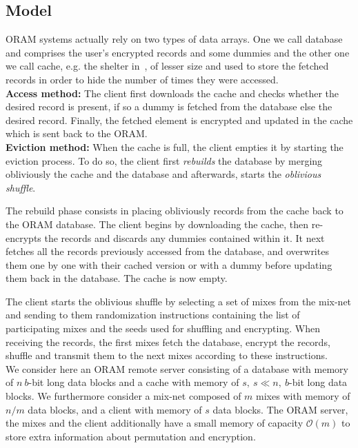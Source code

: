 \documentclass[USenglish,oneside,twocolumn]{article}
\begin{document}
\subsection{Model}\label{Model}

ORAM systems actually rely on two types of data arrays. One we call database and comprises the user's encrypted records and some dummies and the other one we call cache, e.g. the shelter in~\cite{goldreich87}, of lesser size and used to store the fetched records in order to hide the number of times they were accessed.\\

\noindent\textbf{Access method:} The client first downloads the cache and checks whether the desired record is present, if so a dummy is fetched from the database else the desired record. Finally, the fetched element is encrypted and updated in the cache which is sent back to the ORAM.\\

\noindent\textbf{Eviction method:} When the cache is full, the client empties it by starting the eviction process. To do so, the client first \textit{rebuilds} the database by merging obliviously the cache and the database and afterwards, starts the \textit{oblivious shuffle}.

\noindent The rebuild phase consists in placing obliviously records from the cache back to the ORAM database. The client begins by downloading the cache, then re-encrypts the records and discards any dummies contained within it. It next fetches all the records previously accessed from the database, and overwrites them one by one with their cached version or with a dummy before updating them back in the database. The cache is now empty.

\noindent The client starts the oblivious shuffle by selecting a set of mixes from the mix-net and sending to them randomization instructions containing the list of participating mixes and the seeds used for shuffling and encrypting. When receiving the records, the first mixes fetch the database, encrypt the records, shuffle and transmit them to the next mixes according to these instructions.\\

We consider here an ORAM remote server consisting of a database with memory of $n\ b$-bit long data blocks and a cache with memory of $s,\ s\ll n,\ b$-bit long data blocks. We furthermore consider a mix-net composed of $m$ mixes with memory of $n/m$ data blocks, and a client with memory of $s$ data blocks. The ORAM server, the mixes and the client additionally have a small memory of capacity $\mathcal{O}(m)$ to store extra information about permutation and encryption.
\end{document}
